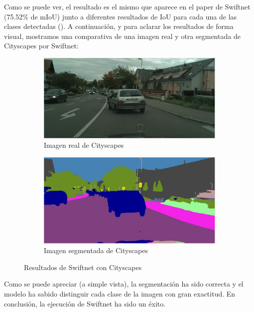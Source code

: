 Como se puede ver, el resultado es el mismo que aparece en el paper de Swiftnet (75.52\% de \ac{mIoU}) junto a diferentes resultados de \ac{IoU} para cada una de las clases detectadas (\cite{swiftnet}). A continuación, y para aclarar los resultados de forma visual, mostramos una comparativa de una imagen real y otra segmentada de Cityscapes por Swiftnet:

\begin{figure}[H]
\centering
  \begin{subfigure}[b]{0.45\linewidth}
    \includegraphics[width=\linewidth]{Figuras/Imagen_Cityscapes_Real.eps}
    \caption{Imagen real de Cityscapes}
  \end{subfigure}
    \begin{subfigure}[b]{0.45\linewidth}
    \includegraphics[width=\linewidth]{Figuras/Imagen_Cityscapes_Segmentada.eps}
    \caption{Imagen segmentada de Cityscapes}
  \end{subfigure}
  \caption{Resultados de Swiftnet con Cityscapes}
\end{figure}

Como se puede apreciar (a simple vista), la segmentación ha sido correcta y el modelo ha sabido distinguir cada clase de la imagen con gran exactitud. En conclusión, la ejecución de Swiftnet ha sido un éxito.

